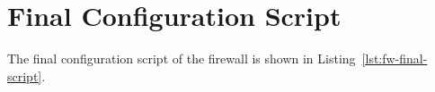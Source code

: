 \section{Final Configuration Script} 
\label{app:fw-final}

The final configuration script of the firewall is shown in
Listing~\ref{lst:fw-final-script}.


